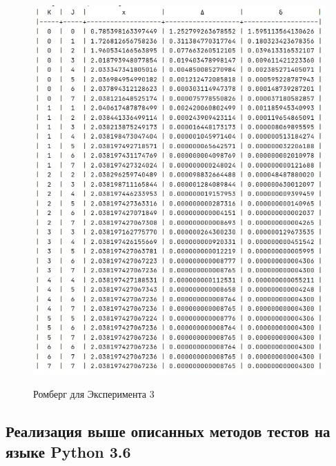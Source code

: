 \documentclass[14pt, titlepage, a4paper]{extarticle} %
\begin{document}
	\begin{figure}[h]
		\centering
		\includegraphics[width=500pt]{r3.jpeg}
		\label{fig:rm3}
		\caption{Ромберг для Эксперимента 3}
	\end{figure}
	
	\subsection*{Реализация выше описанных методов тестов на языке Python 3.6}
	
\end{document}
